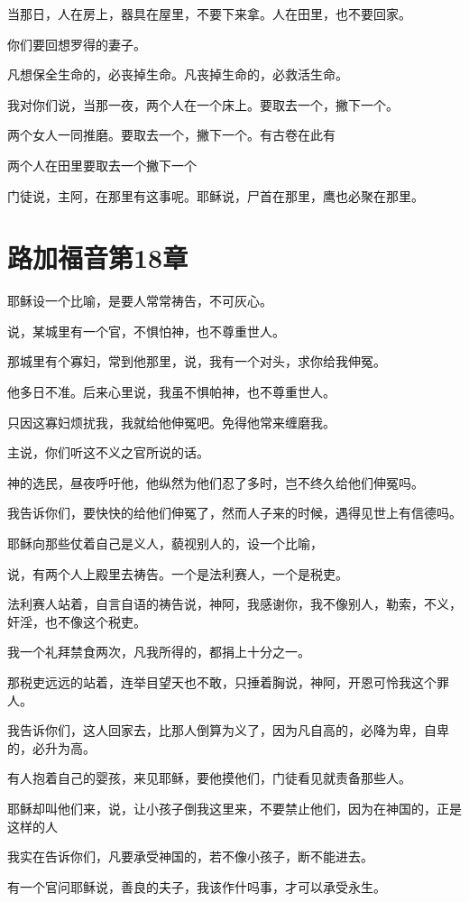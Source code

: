 \documentclass[12pt,oneside]{book}
\begin{document}
当那日，人在房上，器具在屋里，不要下来拿。人在田里，也不要回家。

你们要回想罗得的妻子。

凡想保全生命的，必丧掉生命。凡丧掉生命的，必救活生命。

我对你们说，当那一夜，两个人在一个床上。要取去一个，撇下一个。

两个女人一同推磨。要取去一个，撇下一个。有古卷在此有

两个人在田里要取去一个撇下一个

门徒说，主阿，在那里有这事呢。耶稣说，尸首在那里，鹰也必聚在那里。

\chapter{路加福音第18章}
耶稣设一个比喻，是要人常常祷告，不可灰心。

说，某城里有一个官，不惧怕神，也不尊重世人。

那城里有个寡妇，常到他那里，说，我有一个对头，求你给我伸冤。

他多日不准。后来心里说，我虽不惧帕神，也不尊重世人。

只因这寡妇烦扰我，我就给他伸冤吧。免得他常来缠磨我。

主说，你们听这不义之官所说的话。

神的选民，昼夜呼吁他，他纵然为他们忍了多时，岂不终久给他们伸冤吗。

我告诉你们，要快快的给他们伸冤了，然而人子来的时候，遇得见世上有信德吗。

耶稣向那些仗着自己是义人，藐视别人的，设一个比喻，

说，有两个人上殿里去祷告。一个是法利赛人，一个是税吏。

法利赛人站着，自言自语的祷告说，神阿，我感谢你，我不像别人，勒索，不义，奸淫，也不像这个税吏。

我一个礼拜禁食两次，凡我所得的，都捐上十分之一。

那税吏远远的站着，连举目望天也不敢，只捶着胸说，神阿，开恩可怜我这个罪人。

我告诉你们，这人回家去，比那人倒算为义了，因为凡自高的，必降为卑，自卑的，必升为高。

有人抱着自己的婴孩，来见耶稣，要他摸他们，门徒看见就责备那些人。

耶稣却叫他们来，说，让小孩子倒我这里来，不要禁止他们，因为在神国的，正是这样的人

我实在告诉你们，凡要承受神国的，若不像小孩子，断不能进去。

有一个官问耶稣说，善良的夫子，我该作什吗事，才可以承受永生。
\end{document}
